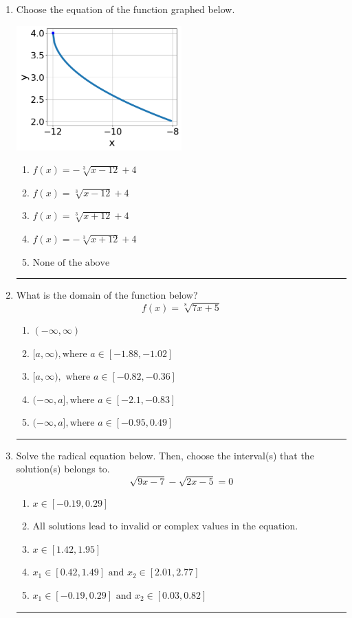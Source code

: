 \documentclass[14pt]{extbook}
\newcommand{\litem}[1]{\item#1\hspace*{-1cm}\rule{\textwidth}{0.4pt}}
\begin{document}
\begin{enumerate}
\litem{
Choose the equation of the function graphed below.
\begin{center}
    \includegraphics[width=0.5\textwidth]{../Figures/radicalGraphToEquationC.png}
\end{center}
\begin{enumerate}[label=\Alph*.]
\item \( f(x) = - \sqrt[3]{x - 12} + 4 \)
\item \( f(x) = \sqrt[3]{x - 12} + 4 \)
\item \( f(x) = \sqrt[3]{x + 12} + 4 \)
\item \( f(x) = - \sqrt[3]{x + 12} + 4 \)
\item \( \text{None of the above} \)

\end{enumerate} }
\litem{
What is the domain of the function below?\[ f(x) = \sqrt[8]{7 x + 5} \]\begin{enumerate}[label=\Alph*.]
\item \( (-\infty, \infty) \)
\item \( [a, \infty), \text{where } a \in [-1.88, -1.02] \)
\item \( [a, \infty), \text{ where } a \in [-0.82, -0.36] \)
\item \( (-\infty, a], \text{where } a \in [-2.1, -0.83] \)
\item \( (-\infty, a], \text{where } a \in [-0.95, 0.49] \)

\end{enumerate} }
\litem{
Solve the radical equation below. Then, choose the interval(s) that the solution(s) belongs to.\[ \sqrt{9 x - 7} - \sqrt{2 x - 5} = 0 \]\begin{enumerate}[label=\Alph*.]
\item \( x \in [-0.19,0.29] \)
\item \( \text{All solutions lead to invalid or complex values in the equation.} \)
\item \( x \in [1.42,1.95] \)
\item \( x_1 \in [0.42, 1.49] \text{ and } x_2 \in [2.01,2.77] \)
\item \( x_1 \in [-0.19, 0.29] \text{ and } x_2 \in [0.03,0.82] \)


\end{enumerate}}
\end{enumerate}
\end{document}
